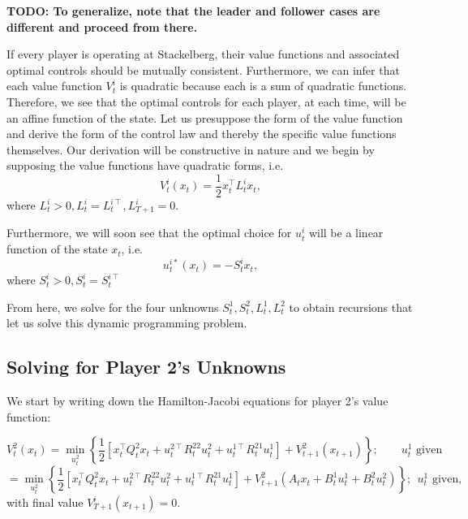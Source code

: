 \documentclass[11pt]{article}
\newcommand{\T}{\intercal}
\begin{document}
\textbf{TODO: To generalize, note that the leader and follower cases are different and proceed from there.}

If every player is operating at Stackelberg, their value functions and associated optimal controls should be mutually consistent. Furthermore, we can infer that each value function $V^i_t$ is quadratic because each is a sum of quadratic functions. Therefore, we see that the optimal controls for each player, at each time, will be an affine function of the state. Let us presuppose the form of the value function and derive the form of the control law and thereby the specific value functions themselves. Our derivation will be constructive in nature and we begin by supposing the value functions have quadratic forms, i.e.
\begin{equation}
\label{eq:value-fn}
V^i_t(x_t) = \frac{1}{2} x^\T_t L^i_t x_t,
\end{equation}
where $L^i_t > 0, L^{i}_t = L^{i\T}_t, L^i_{T+1} = 0$.

Furthermore, we will soon see that the optimal choice for $u^i_t$ will be a linear function of the state $x_t$, i.e.
\begin{equation}
\label{eq:control-fn}
u^{i*}_t(x_t) = -S^i_t x_t,
\end{equation}
where $S^i_t > 0, S^i_t = S^{i\T}_t$

From here, we solve for the four unknowns $S^1_t, S^2_t, L^1_t, L^2_t$ to obtain recursions that let us solve this dynamic programming problem.


\subsection{Solving for Player 2's Unknowns}
\label{ssec:solving-p2-unknowns}
We start by writing down the Hamilton-Jacobi equations for player 2's value function:

\begin{equation}
\label{eq:p2-hamilton-jacobi-eq}
V^2_t(x_{t}) = \min_{u^2_t} \left\{ \frac{1}{2} \left[ x_t^\T Q^2_t x_t + u^{2\T}_t R^{22}_t u^2_t + u^{1\T}_t R^{21}_t u^1_t \right] + V^2_{t+1}(x_{t+1}) \right\}; ~~~~~~~~~ u^1_t \text{ given}
\end{equation}
\begin{equation}
\label{eq:p2-hamilton-jacobi-eq-expanded}
= \min_{u^2_t} \left\{ \frac{1}{2} \left[ x_t^\T Q^2_t x_t + u^{2\T}_t R^{22}_t u^2_t + u^{1\T}_t R^{21}_t u^1_t \right] + V^2_{t+1}(A_t x_t + B^{1}_t u^{1}_t + B^{2}_t u^{2}_t) \right\}; ~~ u^1_t \text{ given},
\end{equation}
with final value $V^i_{T+1}(x_{t+1}) = 0$.
\end{document}
